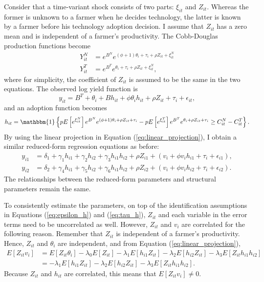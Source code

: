 \documentclass[11pt,letterpaper]{article}
\begin{document}
Consider that a time-variant shock consists of two parts: $\xi_{it}$ and $Z_{it}$.
Whereas the former is unknown to a farmer when he decides technology, the latter is known by a farmer before his technology adoption decision.
I assume that $Z_{it}$ has a zero mean and is independent of a farmer's productivity.
The Cobb-Douglas production functions become
\begin{align*}
  Y_{it}^N &= e^{B^N} e^{(\phi + 1) \theta_i + \tau_i + \rho Z_{it} + \xi_{it}^N} \\
  Y_{it}^T &= e^{B^T} e^{\theta_i + \tau_i + \rho Z_{it} + \xi_{it}^N},
\end{align*}
where for simplicity, the coefficient of $Z_{it}$ is assumed to be the same in the two equations.
The observed log yield function is
\begin{equation*}
  y_{it} = B^T + \theta_i + B h_{it} + \phi \theta_i h_{it} + \rho Z_{it} + \tau_i + \epsilon_{it},
\end{equation*}
and an adoption function becomes
\begin{equation}\label{eq:adoption}
  h_{it} = \mathbbm{1}\left\{p E\left[e^{\xi_{it}^N} \right] e^{B^N} e^{(\phi + 1) \theta_i + \rho Z_{it} + \tau_i} - p E\left[e^{\xi_{it}^T} \right] e^{B^T} e^{\theta_i + \rho Z_{it} + \tau_i} \ge C_{it}^N - C_{it}^T\right\}.
\end{equation}
By using the linear projection in Equation (\ref{eq:linear_projection}), I obtain a similar reduced-form regression equations as before:
\begin{align*}
  y_{i1} &= \delta_1 + \gamma_1 h_{i1} + \gamma_2 h_{i2} + \gamma_3 h_{i1} h_{i2} + \rho Z_{i1} + (v_i + \phi v_i h_{i1} + \tau_i + \epsilon_{i1}), \\
  y_{i2} &= \delta_2 + \gamma_4 h_{i1} + \gamma_5 h_{i2} + \gamma_6 h_{i1} h_{i2} + \rho Z_{i2} + (v_i + \phi v_i h_{i2} + \tau_i + \epsilon_{i2}).
\end{align*}
The relationships between the reduced-form parameters and structural parameters remain the same.

To consistently estimate the parameters, on top of the identification assumptions in Equations (\ref{eq:epsilon_h}) and (\ref{eq:tau_h}), $Z_{it}$ and each variable in the error terms need to be uncorrelated as well.
However, $Z_{it}$ and $v_i$ are correlated for the following reason.
Remember that $Z_{it}$ is independent of a farmer's productivity.
Hence, $Z_{it}$ and $\theta_i$ are independent, and from Equation (\ref{eq:linear_projection}), 
\begin{align*}
  E[Z_{it} v_i] 
  &= E[Z_{it} \theta_i] - \lambda_0 E[Z_{it}] - \lambda_1 E[h_{i1} Z_{it}] - \lambda_2 E[h_{i2} Z_{it}] - \lambda_3 E[Z_{it} h_{i1} h_{i2}] \\
  &=  - \lambda_1 E[h_{i1} Z_{it}] - \lambda_2 E[h_{i2} Z_{it}] - \lambda_3 E[Z_{it} h_{i1} h_{i2}].
\end{align*}
Because $Z_{it}$ and $h_{it}$ are correlated, this means that $E[Z_{it} v_i] \ne 0$.
\end{document}

